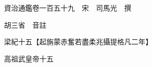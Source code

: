 










 


 
 


 

  
  
  
  
  





  
  
  
  
  
 
  

  

  
  
  



  

 
 

  
   




  

  
  


  　　資治通鑑卷一百五十九　宋　司馬光　撰

　　胡三省　音註

　　梁紀十五【起旃蒙赤奮若盡柔兆攝提格凡二年】

　　高祖武皇帝十五

